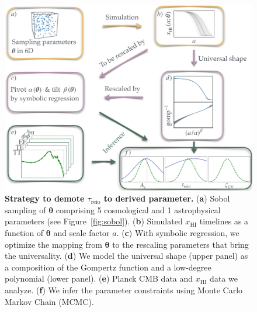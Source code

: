 \documentclass[12pt]{article}
\newcommand{\vtheta}{\boldsymbol{\theta}}
\newcommand{\HI}{\mathrm{HI}}
\newcommand{\reio}{\mathrm{reio}}
\begin{document}
\begin{figure}
\centering
\includegraphics[width=0.9\linewidth]{figs/big_fig.pdf}
\caption{\textbf{\boldmath Strategy to demote $\tau_\reio$ to derived parameter.}
(\textbf{a}) Sobol sampling of $\vtheta$ comprising 5 cosmological and 1
astrophysical parameters (see Figure~\ref{fig:sobol}).
(\textbf{b}) Simulated $x_\HI$ timelines as a function of $\vtheta$ and
scale factor $a$.
(\textbf{c}) With symbolic regression, we optimize the mapping from
$\vtheta$ to the rescaling parameters that bring the universality.
(\textbf{d}) We model the universal shape (upper panel) as a composition of
the Gompertz function and a low-degree polynomial (lower panel).
(\textbf{e}) Planck CMB data and $x_\HI$ data we analyze.
(\textbf{f}) We infer the parameter constraints using Monte Carlo Markov
Chain (MCMC).}
\label{fig:big}
\end{figure}
\end{document}
